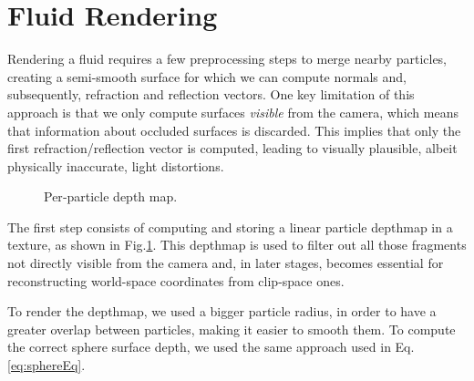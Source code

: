 \section{Fluid Rendering}


\noindent
Rendering a fluid requires a few preprocessing steps to merge nearby particles, creating a semi-smooth surface for which we can compute normals and, subsequently, refraction and reflection vectors. One key limitation of this approach is that we only compute surfaces \textit{visible} from the camera, which means that information about occluded surfaces is discarded. This implies that only the first refraction/reflection vector is computed, leading to visually plausible, albeit physically inaccurate, light distortions.

\begin{figure}[ht!]
    \centering
    \caption{Per‑particle depth map.}\label{fig:depthmaps}
\end{figure}

\noindent
The first step consists of computing and storing a linear particle depthmap in a texture, as shown in Fig.\ref{fig:depthmaps}. This depthmap is used to filter out all those fragments not directly visible from the camera and, in later stages, becomes essential for reconstructing world-space coordinates from clip-space ones.

\noindent
To render the depthmap, we used a bigger particle radius, in order to have a greater overlap between particles, making it easier to smooth them. To compute the correct sphere surface depth, we used the same approach used in Eq.\ref{eq:sphereEq}.

